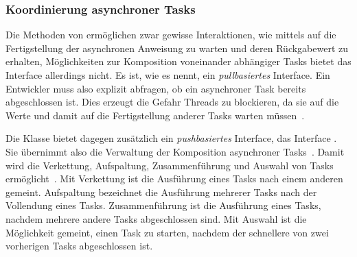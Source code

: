 \subsubsection{Koordinierung asynchroner Tasks}

Die Methoden von  ermöglichen zwar gewisse Interaktionen, wie mittels  auf die Fertigstellung der asynchronen Anweisung zu warten und deren Rückgabewert zu erhalten, Möglichkeiten zur Komposition voneinander abhängiger Tasks bietet das Interface allerdings nicht. Es ist, wie \textcite[S.~240]{Hettel2016} es nennt, ein \emph{pullbasiertes} Interface. Ein Entwickler muss also explizit abfragen, ob ein asynchroner Task bereits abgeschlossen ist. Dies erzeugt die Gefahr Threads zu blockieren, da sie auf die Werte und damit auf die Fertigstellung anderer Tasks warten müssen~\cite[S.~239]{Hettel2016}.

Die Klasse  bietet dagegen zusätzlich ein \emph{pushbasiertes} Interface, das Interface . Sie übernimmt also die Verwaltung der Komposition asynchroner Tasks~\cite[S.~240~ff.]{Hettel2016}. Damit wird die Verkettung, Aufspaltung, Zusammenführung und Auswahl von Tasks ermöglicht~\cite[S.~250~ff.]{Hettel2016}. Mit Verkettung ist die Ausführung eines Tasks nach einem anderen gemeint. Aufspaltung bezeichnet die Ausführung mehrerer Tasks nach der Vollendung eines Tasks. Zusammenführung ist die Ausführung eines Tasks, nachdem mehrere andere Tasks abgeschlossen sind. Mit Auswahl ist die Möglichkeit gemeint, einen Task zu starten, nachdem der schnellere von zwei vorherigen Tasks abgeschlossen ist.
